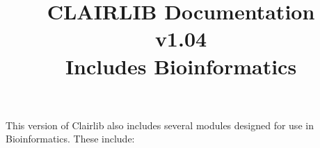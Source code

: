 

\title{\Huge CLAIRLIB Documentation\\ v1.04\\ Includes Bioinformatics}









This version of Clairlib also includes several modules designed for use in Bioinformatics.  These include:








